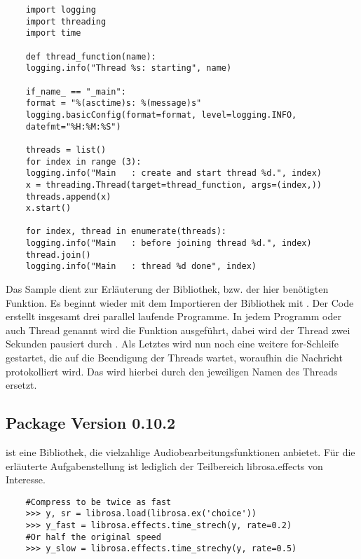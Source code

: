 \begin{verbatim}
    import logging
    import threading
    import time
    
    def thread_function(name):
    logging.info("Thread %s: starting", name)
    
    if_name_ == "_main":
    format = "%(asctime)s: %(message)s"
    logging.basicConfig(format=format, level=logging.INFO, 
    datefmt="%H:%M:%S")
    
    threads = list()
    for index in range (3):
    logging.info("Main   : create and start thread %d.", index)
    x = threading.Thread(target=thread_function, args=(index,))
    threads.append(x)
    x.start()
    
    for index, thread in enumerate(threads):
    logging.info("Main   : before joining thread %d.", index)
    thread.join()
    logging.info("Main   : thread %d done", index)
\end{verbatim}


Das Sample dient zur Erläuterung der Bibliothek, bzw. der hier benötigten Funktion. Es beginnt wieder mit dem Importieren der Bibliothek mit . Der Code erstellt insgesamt drei parallel laufende Programme. In jedem Programm oder auch Thread genannt wird die Funktion  ausgeführt, dabei wird der Thread zwei Sekunden pausiert durch . Als Letztes wird nun noch eine weitere for-Schleife gestartet, die auf die Beendigung der Threads wartet, woraufhin die Nachricht  protokolliert wird. Das  wird hierbei durch den jeweiligen Namen des Threads ersetzt. \cite{Python:2024Threading}

\subsection{Package  Version 0.10.2}

 ist eine Bibliothek, die vielzahlige Audiobearbeitungsfunktionen anbietet. Für die erläuterte Aufgabenstellung ist lediglich der Teilbereich librosa.effects von Interesse. 

\begin{verbatim}
    #Compress to be twice as fast 
    >>> y, sr = librosa.load(librosa.ex('choice'))
    >>> y_fast = librosa.effects.time_strech(y, rate=0.2)
    #Or half the original speed
    >>> y_slow = librosa.effects.time_strechy(y, rate=0.5)
\end{verbatim}

